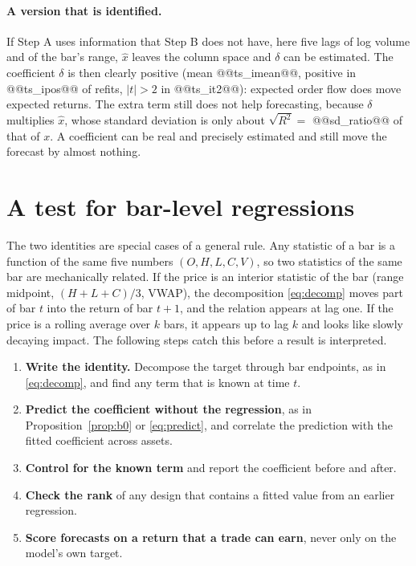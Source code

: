 \documentclass[11pt,a4paper]{article}
\begin{document}
\paragraph{A version that is identified.} If Step A uses information that Step B does not have, here five
lags of log volume and of the bar's range, $\hat x$ leaves the column space and $\delta$ can be estimated. The coefficient $\delta$ is then clearly positive (mean @@ts_imean@@, positive in @@ts_ipos@@ of refits, $|t|>2$ in @@ts_it2@@):
expected order flow does move expected returns. The extra term still does not help forecasting, because $\delta$
multiplies $\hat x$, whose standard deviation is only about $\sqrt{R^2}=$ @@sd_ratio@@ of that of $x$. A
coefficient can be real and precisely estimated and still move the forecast by almost nothing.

\section{A test for bar-level regressions}
\label{sec:checklist}

The two identities are special cases of a general rule. Any statistic of a bar is a function of the same
five numbers $(O,H,L,C,V)$, so two statistics of the same bar are mechanically related. If the price is
an interior statistic of the bar (range midpoint, $(H+L+C)/3$, VWAP), the decomposition \eqref{eq:decomp}
moves part of bar $t$ into the return of bar $t+1$, and the relation appears at lag one. If the price is
a rolling average over $k$ bars, it appears up to lag $k$ and looks like slowly decaying impact. The
following steps catch this before a result is interpreted.

\begin{enumerate}
\item \textbf{Write the identity.} Decompose the target through bar endpoints, as in \eqref{eq:decomp},
and find any term that is known at time $t$.
\item \textbf{Predict the coefficient without the regression}, as in Proposition~\ref{prop:b0} or
\eqref{eq:predict}, and correlate the prediction with the fitted coefficient across assets.
\item \textbf{Control for the known term} and report the coefficient before and after.
\item \textbf{Check the rank} of any design that contains a fitted value from an earlier regression.
\item \textbf{Score forecasts on a return that a trade can earn}, never only on the model's own target.
\end{enumerate}
\end{document}
